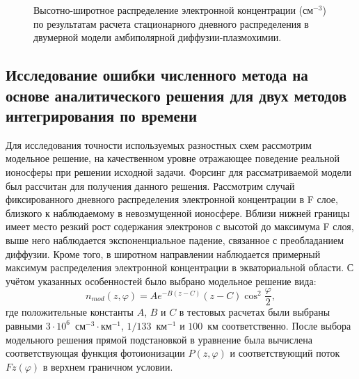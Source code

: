 \documentclass[14pt, a4paper]{extarticle}
\begin{document}
\begin{figure}[H]

\caption{Высотно-широтное распределение электронной концентрации (см$^{-3}$) по результатам расчета стационарного дневного распределения в двумерной модели амбиполярной диффузии-плазмохимии.}
\end{figure}


\subsection{Исследование ошибки численного метода на основе аналитического решения для двух методов интегрирования по времени}

Для исследования точности используемых разностных схем рассмотрим модельное решение, на качественном уровне отражающее поведение реальной ионосферы при решении исходной задачи. Форсинг для рассматриваемой модели был рассчитан для получения данного решения. Рассмотрим случай фиксированного дневного распределения электронной концентрации в F слое, близкого к наблюдаемому в невозмущенной ионосфере. Вблизи нижней границы имеет место резкий рост содержания электронов с высотой до максимума F слоя, выше него наблюдается экспоненциальное падение, связанное с преобладанием диффузии. Кроме того, в широтном направлении наблюдается примерный максимум распределения электронной концентрации в экваториальной области. С учётом указанных особенностей было выбрано модельное решение вида:
\begin{equation}
n_{mod}(z, \varphi) = Ae^{-B(z-C)}(z-C)\cos^2\dfrac{\varphi}{2},
\label{n_mod}
\end{equation}
где положительные константы $A$, $B$ и $C$ в тестовых расчетах были выбраны равными $3\cdot 10^6$~см$^{-3}\cdot$км$^{-1}$, $1/133$~км$^{-1}$ и $100$~км соответственно. После выбора модельного решения прямой подстановкой в уравнение была вычислена соответствующая функция фотоионизации $P(z, \varphi)$ и соответствующий поток $Fz(\varphi)$ в верхнем граничном условии.
\end{document}
